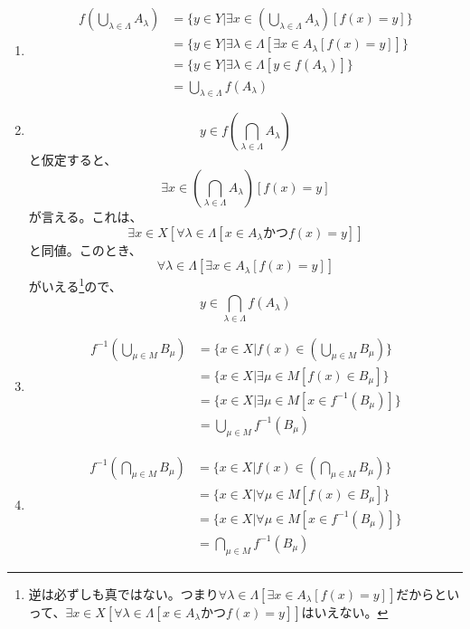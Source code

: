 \documentclass{jsarticle}
\begin{document}
\subsection{}
\begin{enumerate}
\item
\begin{align*}
f(\bigcup_{\lambda\in\Lambda}A_\lambda)&=\{y\in Y| \exists x \in(\bigcup_{\lambda\in\Lambda}A_\lambda)[f(x)=y]\} \\
&=\{y\in Y|\exists \lambda \in \Lambda[\exists x \in A_\lambda[f(x)=y]]\}\\
&=\{y\in Y|\exists \lambda \in \Lambda[y\in f(A_\lambda)]\}\\
&=\bigcup_{\lambda \in \Lambda}f(A_\lambda)
\end{align*}
\item
\[y\in f(\bigcap_{\lambda\in\Lambda}A_\lambda)\]と仮定すると、\[\exists x \in(\bigcap_{\lambda\in\Lambda}A_\lambda)[f(x)=y]\]が言える。これは、
\[\exists x \in X[\forall \lambda \in \Lambda[x \in A_\lambda　かつ f(x)=y]]\]
と同値。このとき、
\[\forall \lambda \in \Lambda[\exists x \in A_\lambda [f(x)=y]]\]
がいえる\footnote{逆は必ずしも真ではない。つまり$\forall \lambda \in \Lambda[\exists x \in A_\lambda [f(x)=y]]$だからといって、$\exists x \in X[\forall \lambda \in \Lambda[x \in A_\lambda　かつ f(x)=y]]$はいえない。}ので、
\[y\in \bigcap_{\lambda\in\Lambda}f(A_{\lambda})\]

\item
\begin{align*}
f^{-1}(\bigcup_{\mu\in M}B_{\mu})&=\{x\in X| f(x) \in(\bigcup_{\mu\in M}B_{\mu})\} \\
&=\{x\in X| \exists \mu \in M [f(x) \in B_{\mu}]\}\\
&=\{x\in X| \exists \mu \in M [x\in f^{-1}(B_{\mu})]\}\\
&=\bigcup_{\mu\in M}f^{-1}(B_{\mu})
\end{align*}

\item
\begin{align*}
f^{-1}(\bigcap_{\mu\in M}B_{\mu})&=\{x\in X|f(x)\in(\bigcap_{\mu\in M}B_{\mu}) \}\\
&=\{x\in X | \forall \mu\in M[f(x)\in B_{\mu}]\}\\
&=\{x\in X | \forall \mu\in M [x\in f^{-1}(B_{\mu})]\}\\
&=\bigcap_{\mu\in M}f^{-1}(B_{\mu})
\end{align*}
\end{enumerate}
\end{document}
